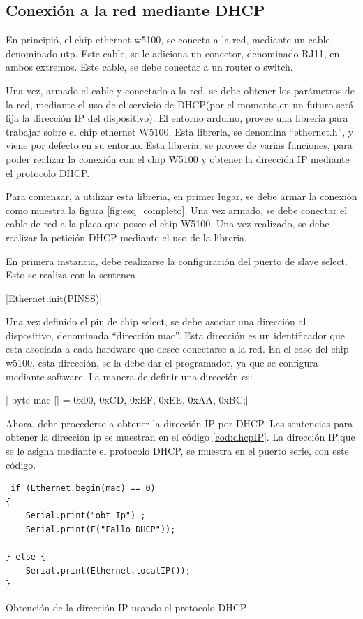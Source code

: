 \subsection{Conexión a la red mediante DHCP} 

En principió, el chip ethernet w5100, se conecta a la red, mediante un cable denominado utp. Este cable, se le adiciona un conector, denominado RJ11, en ambos extremos. Este cable, se debe conectar a un router o switch.   

 Una vez, armado el cable y conectado a la red, se debe obtener los parámetros de la red, mediante el uso de el servicio de DHCP(por el momento,en un futuro será fija la dirección IP del dispositivo). El entorno arduino, provee una libreria para trabajar sobre el chip ethernet W5100. Esta libreria, se denomina ``ethernet.h'', y viene por defecto en su entorno. Esta libreria, se provee de varias funciones, para poder realizar la conexión con el chip W5100 y obtener la dirección IP mediante el protocolo DHCP. 
 
 Para comenzar, a utilizar esta libreria, en primer lugar, se debe armar la conexión como muestra la figura \ref{fig:esq_completo}. Una vez armado, se debe conectar el cable de red a la placa que posee el chip W5100. Una vez realizado, se debe realizar la petición DHCP mediante el uso de la libreria. 
 
  
En primera instancia, debe realizarse la configuración del puerto de slave select. Esto se realiza con la sentenca 

|Ethernet.init(PINSS)| 

Una vez definido el pin de chip select, se debe asociar una dirección al dispositivo, denominada ``dirección mac''. Esta dirección es un identificador que esta asociada a cada hardware que desee conectarse a la red. En el caso del chip w5100, esta dirección, se la debe dar el programador, ya que se configura mediante software. La manera de definir una dirección es: 

|  byte mac [] = {0x00, 0xCD, 0xEF, 0xEE, 0xAA, 0xBC};|  

Ahora, debe procederse a obtener la dirección IP por DHCP. Las sentencias para obtener la dirección ip se muestran en el código \ref{cod:dhcpIP}. La dirección IP,que se le asigna mediante el protocolo DHCP, se muestra en el puerto serie, con este código.

\begin{listing}[ht]
	\begin{verbatim}
 if (Ethernet.begin(mac) == 0)
{
	Serial.print("obt_Ip") ;
	Serial.print(F("Fallo DHCP"));
	
} else {
	Serial.print(Ethernet.localIP());
}		
	\end{verbatim}
\caption{Obtención de la dirección IP usando el protocolo DHCP} 	
\label{cod:dhcpIP} 
\end{listing}


